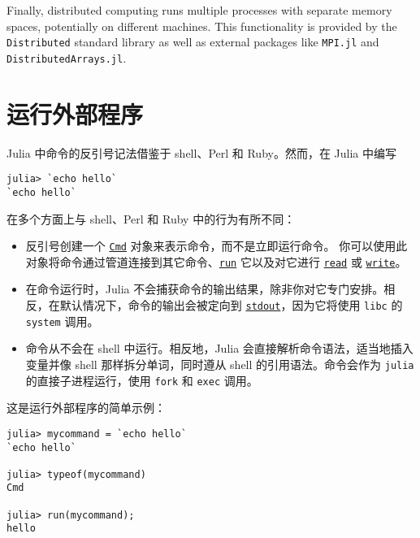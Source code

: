 Finally, distributed computing runs multiple processes with separate memory spaces, potentially on different machines. This functionality is provided by the \texttt{Distributed} standard library as well as external packages like \texttt{MPI.jl} and \texttt{DistributedArrays.jl}.



\hypertarget{12867141128563676518}{}


\chapter{运行外部程序}



Julia 中命令的反引号记法借鉴于 shell、Perl 和 Ruby。然而，在 Julia 中编写




\begin{verbatim}
julia> `echo hello`
`echo hello`
\end{verbatim}



在多个方面上与 shell、Perl 和 Ruby 中的行为有所不同：



\begin{itemize}
\item 反引号创建一个 \hyperlink{10541952265148699805}{\texttt{Cmd}} 对象来表示命令，而不是立即运行命令。 你可以使用此对象将命令通过管道连接到其它命令、\hyperlink{18309243184998755104}{\texttt{run}} 它以及对它进行 \hyperlink{8104134490906192097}{\texttt{read}} 或 \hyperlink{16947913578760238729}{\texttt{write}}。


\item 在命令运行时，Julia 不会捕获命令的输出结果，除非你对它专门安排。相反，在默认情况下，命令的输出会被定向到 \hyperlink{18181294266083891471}{\texttt{stdout}}，因为它将使用 \texttt{libc} 的 \texttt{system} 调用。


\item 命令从不会在 shell 中运行。相反地，Julia 会直接解析命令语法，适当地插入变量并像 shell 那样拆分单词，同时遵从 shell 的引用语法。命令会作为 \texttt{julia} 的直接子进程运行，使用 \texttt{fork} 和 \texttt{exec} 调用。

\end{itemize}


这是运行外部程序的简单示例：




\begin{verbatim}
julia> mycommand = `echo hello`
`echo hello`

julia> typeof(mycommand)
Cmd

julia> run(mycommand);
hello
\end{verbatim}



